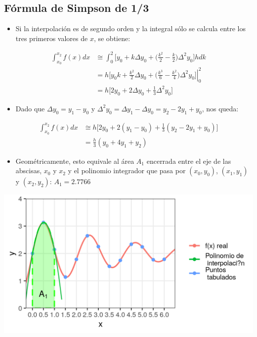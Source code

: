 \documentclass[openany]{book}
\providecommand{\tightlist}{%
  \setlength{\itemsep}{0pt}\setlength{\parskip}{0pt}}
\begin{document}
\hypertarget{fuxf3rmula-de-simpson-de-13}{%
\subsection{Fórmula de Simpson de 1/3}\label{fuxf3rmula-de-simpson-de-13}}

\begin{itemize}
\tightlist
\item
  Si la interpolación es de segundo orden y la integral sólo se calcula entre los tres primeros valores de \(x\), se obtiene:
\end{itemize}

\[
\begin{aligned}
\int_{x_0}^{x_2} f(x)dx &\cong  \int_{0}^{2} \Big[ y_0 + k \Delta y_0 + \Big( \frac{k^2}{2} - \frac{k}{2} \Big) \Delta^2 y_0 \Big]  hdk \\
&= h \left. \Big[ y_0 k + \frac{k^2}{2} \Delta y_0  + \Big( \frac{k^3}{6} - \frac{k^2}{4} \Big) \Delta^2 y_0 \Big] \right\vert_{0}^{2} \\
&= h \Big[ 2y_0 + 2 \Delta y_0  + \frac{1}{3} \Delta^2 y_0 \Big]
\end{aligned}
\]

\begin{itemize}
\tightlist
\item
  Dado que \(\Delta y_0 = y_1 - y_0\) y \(\Delta^2 y_0 = \Delta y_1 - \Delta y_0 = y_2 - 2y_1 + y_0\), nos queda:
\end{itemize}

\[
\begin{aligned}
\int_{x_0}^{x_2} f(x)dx &\cong h \Big[ 2y_0 + 2 (y_1 - y_0)  + \frac{1}{3} (y_2 - 2y_1 + y_0) \Big] \\
&= \frac{h}{3} (y_0 + 4y_1 + y_2)
\end{aligned}
\]

\begin{itemize}
\tightlist
\item
  Geométricamente, esto equivale al área \(A_1\) encerrada entre el eje de las abscisas, \(x_0\) y \(x_2\) y el polinomio integrador que pasa por \((x_0, y_0)\), \((x_1, y_1)\) y \((x_2, y_2)\): \hspace{3cm} \(A_1=2.7766\)
\end{itemize}

\begin{center}\includegraphics[width=0.95\linewidth]{Plots/U4/Unidad4_2_g5} \end{center}
\end{document}

